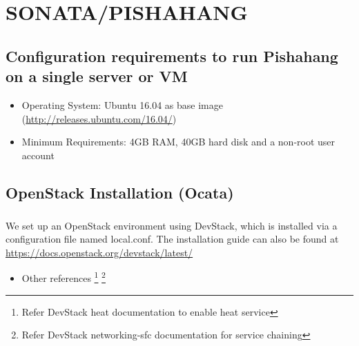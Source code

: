 \chapter{SONATA/PISHAHANG}
\label{ch:pishahang}

	\section{Configuration requirements to run Pishahang on a single server or VM}
	\label{sec:Configuration requirements to run Pishahang on a single server or VM}
	\begin{itemize}
		\item Operating System: Ubuntu 16.04 as base image (\hyperlink{name}{http://releases.ubuntu.com/16.04/})
		\item Minimum Requirements: 4GB RAM, 40GB hard disk and a non-root user account
	\end{itemize}
	
	
	\section{OpenStack Installation (Ocata)}
	\label{OpenStack Installation}
	\paragraph{}
	We set up an OpenStack environment using DevStack, which is installed via a configuration file named local.conf. The installation guide can also be found at\\ \hyperlink{name}{https://docs.openstack.org/devstack/latest/} 
	
	\begin{itemize}
		\item Other references 
		\footnote{Refer DevStack heat documentation to enable heat service}
		\footnote{Refer DevStack networking-sfc documentation for service chaining}
	\end{itemize}
	

